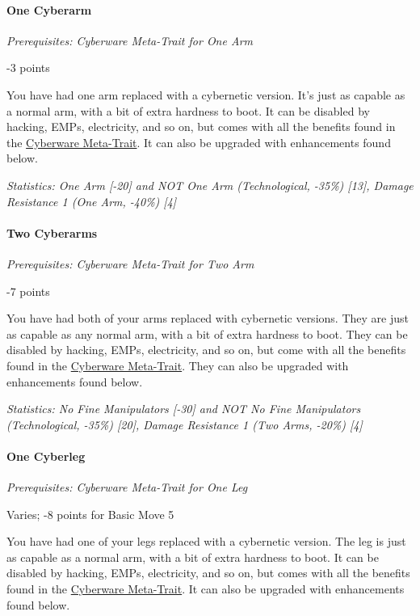 \begin{multicols*}{3}
	\paragraph{One Cyberarm}
	\textit{Prerequisites:  Cyberware Meta-Trait for One Arm}
	\begin{flushright}
		-3 points
	\end{flushright}
	
	You have had one arm replaced with a cybernetic version. It's just as capable as a normal arm, with a bit of extra hardness to boot. It can be disabled by hacking, EMPs, electricity, and so on, but comes with all the benefits found in the \hyperref[cyberware-meta-trait]{Cyberware Meta-Trait}. It can also be upgraded with enhancements found below.
	
	\textit{\textcolor{OliveGreen}{Statistics: One Arm [-20] and NOT One Arm (Technological, -35\%) [13], Damage Resistance 1 (One Arm, -40\%) [4]}}
	
	\paragraph{Two Cyberarms}
	\textit{Prerequisites:  Cyberware Meta-Trait for Two Arm}
	\begin{flushright}
		-7 points
	\end{flushright}
	
	You have had both of your arms replaced with cybernetic versions. They are just as capable as any normal arm, with a bit of extra hardness to boot. They can be disabled by hacking, EMPs, electricity, and so on, but come with all the benefits found in the \hyperref[cyberware-meta-trait]{Cyberware Meta-Trait}. They can also be upgraded with enhancements found below.
	
	\textit{\textcolor{OliveGreen}{Statistics:  No Fine Manipulators [-30] and NOT No Fine Manipulators (Technological, -35\%) [20], Damage Resistance 1 (Two Arms, -20\%) [4]}}
			
	\paragraph{One Cyberleg}
	\textit{Prerequisites:  Cyberware Meta-Trait for One Leg}
	\begin{flushright}
		Varies; -8 points for Basic Move 5
	\end{flushright}
	
	You have had one of your legs replaced with a cybernetic version. The leg is just as capable as a normal arm, with a bit of extra hardness to boot. It can be disabled by hacking, EMPs, electricity, and so on, but comes with all the benefits found in the \hyperref[cyberware-meta-trait]{Cyberware Meta-Trait}. It can also be upgraded with enhancements found below.
	

\end{multicols*}

